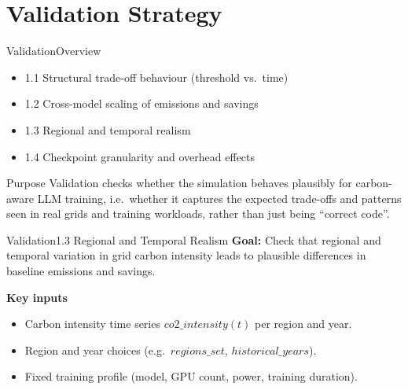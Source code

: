 
\section{Validation Strategy}

\begin{frame}{Validation}{Overview}
  \begin{itemize}
    \item 1.1 Structural trade-off behaviour (threshold vs.\ time)
    \item 1.2 Cross-model scaling of emissions and savings
    \item 1.3 Regional and temporal realism
    \item 1.4 Checkpoint granularity and overhead effects
  \end{itemize}
  \vspace{0.5cm}
  \begin{block}{Purpose}
    Validation checks whether the simulation behaves plausibly for carbon-aware LLM
    training, i.e.\ whether it captures the expected trade-offs and patterns
    seen in real grids and training workloads, rather than just being
    ``correct code''.
  \end{block}
\end{frame}


\begin{frame}{Validation}{1.3 Regional and Temporal Realism}
  \textbf{Goal:} Check that regional and temporal variation in grid carbon intensity
  leads to plausible differences in baseline emissions and savings.
  \vspace{0.3cm}

  \textbf{Key inputs}
  \begin{itemize}
    \item Carbon intensity time series $\mathit{co2\_intensity}(t)$ per region and year.
    \item Region and year choices (e.g.\ $\mathit{regions\_set}$, $\mathit{historical\_years}$).
    \item Fixed training profile (model, GPU count, power, training duration).
  \end{itemize}
\end{frame}

